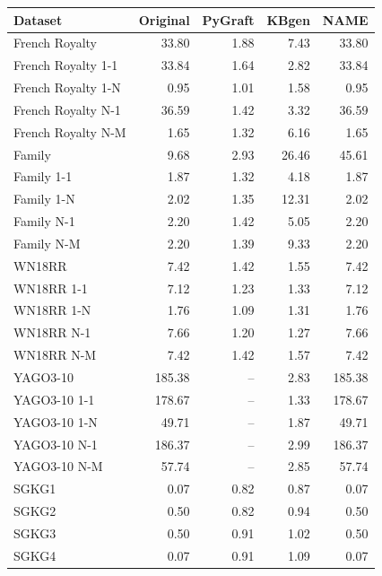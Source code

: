 \begin{tabular}{lrrrr}
\toprule
Dataset & Original & PyGraft & KBgen & NAME \\
\midrule
French Royalty & 33.80 & 1.88 & 7.43 & 33.80 \\
French Royalty 1-1 & 33.84 & 1.64 & 2.82 & 33.84 \\
French Royalty 1-N & 0.95 & 1.01 & 1.58 & 0.95 \\
French Royalty N-1 & 36.59 & 1.42 & 3.32 & 36.59 \\
French Royalty N-M & 1.65 & 1.32 & 6.16 & 1.65 \\
\midrule
Family & 9.68 & 2.93 & 26.46 & 45.61 \\
Family 1-1 & 1.87 & 1.32 & 4.18 & 1.87 \\
Family 1-N & 2.02 & 1.35 & 12.31 & 2.02 \\
Family N-1 & 2.20 & 1.42 & 5.05 & 2.20 \\
Family N-M & 2.20 & 1.39 & 9.33 & 2.20 \\
\midrule
WN18RR & 7.42 & 1.42 & 1.55 & 7.42 \\
WN18RR 1-1 & 7.12 & 1.23 & 1.33 & 7.12 \\
WN18RR 1-N & 1.76 & 1.09 & 1.31 & 1.76 \\
WN18RR N-1 & 7.66 & 1.20 & 1.27 & 7.66 \\
WN18RR N-M & 7.42 & 1.42 & 1.57 & 7.42 \\
\midrule
YAGO3-10 & 185.38 & – & 2.83 & 185.38 \\
YAGO3-10 1-1 & 178.67 & – & 1.33 & 178.67 \\
YAGO3-10 1-N & 49.71 & – & 1.87 & 49.71 \\
YAGO3-10 N-1 & 186.37 & – & 2.99 & 186.37 \\
YAGO3-10 N-M & 57.74 & – & 2.85 & 57.74 \\
\midrule
SGKG1 & 0.07 & 0.82 & 0.87 & 0.07 \\
SGKG2 & 0.50 & 0.82 & 0.94 & 0.50 \\
SGKG3 & 0.50 & 0.91 & 1.02 & 0.50 \\
SGKG4 & 0.07 & 0.91 & 1.09 & 0.07 \\
\bottomrule
\end{tabular}
